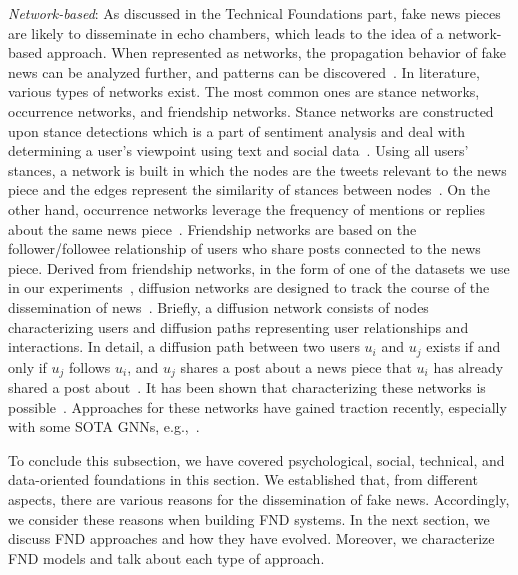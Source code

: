 \begin{description}
    \item{\emph{Network-based}:} As discussed in the Technical Foundations part, fake news pieces are likely to disseminate in echo chambers, which leads to the idea of a network-based approach. When represented as networks, the propagation behavior of fake news can be analyzed further, and patterns can be discovered~\parencite{FakeNewsDetectionOnSocialMediaADataMiningPerspective_Shu}. In literature, various types of networks exist. The most common ones are stance networks, occurrence networks, and friendship networks. Stance networks are constructed upon stance detections which is a part of sentiment analysis and deal with determining a user’s viewpoint using text and social data~\parencite{StanceClassificationAttention_Du}. Using all users’ stances, a network is built in which the nodes are the tweets relevant to the news piece and the edges represent the similarity of stances between nodes~\parencite{NewsVerificationByExploitingConflictingSocialViewpoints_Jin, SomeLikeItHoaxDataset_Tacchini}. On the other hand, occurrence networks leverage the frequency of mentions or replies about the same news piece~\parencite{ProminentFeaturesOfRumorPropagation_Kwon}. Friendship networks are based on the follower/followee relationship of users who share posts connected to the news piece. Derived from friendship networks, in the form of one of the datasets we use in our experiments~\parencite{UPFD_Dataset_Shu}, diffusion networks are designed to track the course of the dissemination of news~\parencite{ProminentFeaturesOfRumorPropagation_Kwon}. Briefly, a diffusion network consists of nodes characterizing users and diffusion paths representing user relationships and interactions. In detail, a diffusion path between two users $u_i$ and $u_j$ exists if and only if $u_j$ follows $u_i$, and $u_j$ shares a post about a news piece that $u_i$ has already shared a post about~\parencite{FakeNewsDetectionOnSocialMediaADataMiningPerspective_Shu}. It has been shown that characterizing these networks is possible~\parencite{ProminentFeaturesOfRumorPropagation_Kwon}. Approaches for these networks have gained traction recently, especially with some SOTA GNNs, e.g.,~\parencite{FakeNewsDetectionUsingGeometricDeepLearning_Monti}.
\end{description}
To conclude this subsection, we have covered psychological, social, technical, and data-oriented foundations in this section. We established that,  from different aspects, there are various reasons for the dissemination of fake news. Accordingly, we consider these reasons when building FND systems. In the next section, we discuss FND approaches and how they have evolved. Moreover, we characterize FND models and talk about each type of approach.

